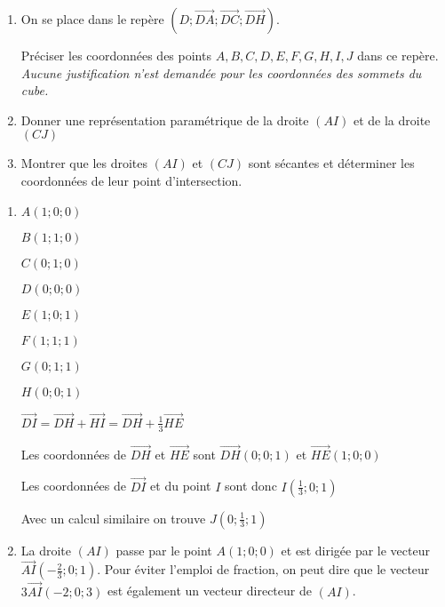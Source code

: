 \begin{enumerate}
     \item
     On se place dans le repère $\left(D; \overrightarrow{DA}; \overrightarrow{DC}; \overrightarrow{DH}\right)$.
     \par
     Préciser les coordonnées des points $A, B, C, D, E, F, G, H, I, J$ dans ce repère.
     \textit{Aucune justification n'est demandée pour les coordonnées des sommets du cube.}
     \item
     Donner une représentation paramétrique de la droite $\left(AI\right)$ et de la droite $\left(CJ\right)$
     \item
     Montrer que les droites $\left(AI\right)$ et $\left(CJ\right)$ sont sécantes et déterminer les coordonnées de leur point d'intersection.
\end{enumerate}
\begin{corrige}
     \begin{enumerate}
          \item
          $A\left(1 ; 0 ; 0\right)$
          \par
          $B\left(1 ; 1 ; 0\right)$
          \par
          $C\left(0 ; 1 ; 0\right)$
          \par
          $D\left(0 ; 0 ; 0\right)$
          \par
          $E\left(1 ; 0 ; 1\right)$
          \par
          $F\left(1 ; 1 ; 1\right)$
          \par
          $G\left(0 ; 1 ; 1\right)$
          \par
          $H\left(0 ; 0 ; 1\right)$
          \par
          $\overrightarrow{DI}=\overrightarrow{DH}+\overrightarrow{HI} = \overrightarrow{DH}+\frac{1}{3}\overrightarrow{HE}$
          \par
          Les coordonnées de $\overrightarrow{DH}$ et $\overrightarrow{HE}$ sont $\overrightarrow{DH} \left(0 ; 0 ; 1\right)$ et $\overrightarrow{HE} \left(1 ; 0 ; 0\right)$
          \par
          Les coordonnées de $\overrightarrow{DI}$ et du point $I$ sont donc $I \left(\frac{1}{3} ; 0 ; 1\right)$
          \par
          Avec un calcul similaire on trouve $J \left(0 ; \frac{1}{3} ; 1\right)$
          \item
          La droite $\left(AI\right)$ passe par le point $A\left(1 ; 0 ; 0\right)$ et est dirigée par le vecteur $\overrightarrow{AI}\left(-\frac{2}{3} ; 0 ; 1\right)$. Pour éviter l'emploi de fraction, on peut dire que le vecteur $3\overrightarrow{AI}\left(-2 ; 0 ; 3\right)$ est également un vecteur directeur de $\left(AI\right)$.

\end{enumerate}
\end{corrige}

